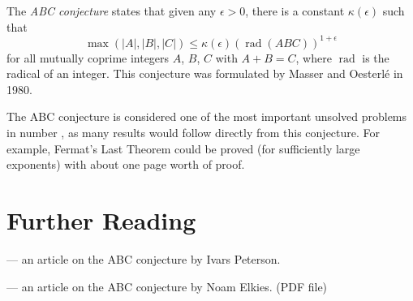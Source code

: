 \documentclass[12pt]{article}
\newcommand{\rad}{\operatorname{rad}}
\begin{document}
The \emph{ABC conjecture} states that given any $\epsilon > 0$,
there is a constant $\kappa ( \epsilon )$ such that
\[
  \max(|A|,|B|,|C|) \leq \kappa ( \epsilon ) ( \rad (ABC))^{1 + \epsilon}
\]
for all mutually coprime integers $A$, $B$, $C$ with $A+B=C$,
where $\rad$ is the radical of an integer.
This conjecture was formulated by Masser and Oesterl\'{e} in 1980.

The ABC conjecture is considered 
one of the most important unsolved problems in number ,
as many results would follow directly from this conjecture.
For example, Fermat's Last Theorem could be proved (for sufficiently large exponents)
with about one page worth of proof.

\section*{Further Reading}

--- an article on the ABC conjecture by Ivars Peterson.

--- an article on the ABC conjecture by Noam Elkies. (PDF file)

\end{document}
